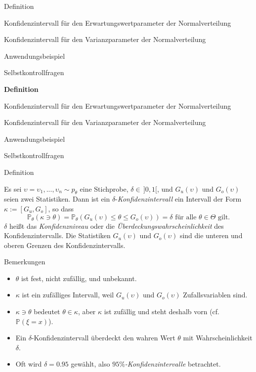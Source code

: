 \documentclass[
  8pt,
  ignorenonframetext,
]{beamer}
\providecommand{\tightlist}{%
  \setlength{\itemsep}{0pt}\setlength{\parskip}{0pt}}
\newcommand{\ups} {\upsilon}
\begin{document}
\begin{frame}{}
\protect\hypertarget{section-5}{}
\large

Definition

Konfidenzintervall für den Erwartungswertparameter der Normalverteilung

Konfidenzintervall für den Varianzparameter der Normalverteilung

Anwendungsbeispiel

Selbstkontrollfragen
\end{frame}

\begin{frame}{}
\protect\hypertarget{section-6}{}
\large

\textbf{Definition}

Konfidenzintervall für den Erwartungswertparameter der Normalverteilung

Konfidenzintervall für den Varianzparameter der Normalverteilung

Anwendungsbeispiel

Selbstkontrollfragen
\end{frame}

\begin{frame}{Definition}
\protect\hypertarget{definition}{}
\small
\begin{definition}
\justifying
Es sei $\ups = \ups_1,...,\ups_n \sim p_\theta$ eine Stichprobe, $\delta \in \,]0,1[$,
und $G_u(\ups)$ und $G_o(\ups)$ seien zwei Statistiken. Dann ist ein
$\delta$-\textit{Konfidenzintervall} ein Intervall der Form $\kappa := [G_u, G_o]$, so dass
\begin{equation}
\mathbb{P}_\theta\left(\kappa \ni \theta\right) =
\mathbb{P}_\theta\left(G_u(\ups) \le \theta \le G_o(\ups) \right) =
\delta \mbox{ für alle } \theta \in \Theta \mbox{ gilt}.
\end{equation}
$\delta$ heißt das \textit{Konfidenzniveau} oder die \textit{Überdeckungswahrscheinlichkeit}
des Konfidenzintervalls. Die Statistiken $G_u(\ups)$ und $G_o(\ups)$ sind die unteren
und oberen Grenzen des Konfidenzintervalls.
\end{definition}

\footnotesize

Bemerkungen

\begin{itemize}
\tightlist
\item
  \(\theta\) ist fest, nicht zufällig, und unbekannt.
\item
  \(\kappa\) ist ein zufälliges Intervall, weil \(G_u(\ups)\) und
  \(G_o(\ups)\) Zufallsvariablen sind.
\item
  \(\kappa \ni \theta\) bedeutet \(\theta \in \kappa\), aber \(\kappa\)
  ist zufällig und steht deshalb vorn (cf.~\(\mathbb{P}(\xi = x)\)).
\item
  Ein \(\delta\)-Konfidenzintervall überdeckt den wahren Wert \(\theta\)
  mit Wahrscheinlichkeit \(\delta\).
\item
  Oft wird \(\delta = 0.95\) gewählt, also
  \textit{$95\%$-Konfidenzintervalle} betrachtet.
\end{itemize}
\end{frame}
\end{document}
